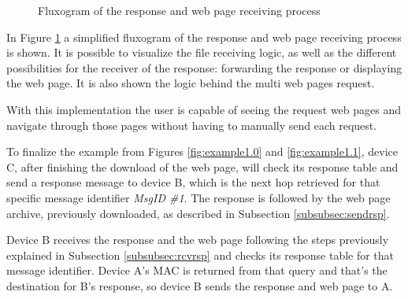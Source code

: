 \begin{figure}[ht]
   \noindent{}
	\caption{\label{fig:rsprcvflux} Fluxogram of the response and web page receiving process}
\end{figure}

In Figure \ref{fig:rsprcvflux} a simplified fluxogram of the response and web page receiving process is shown. It is possible to visualize the file receiving logic, as well as the different possibilities for the receiver of the response: forwarding the response or displaying the web page. It is also shown the logic behind the multi web pages request.

With this implementation the user is capable of seeing the request web pages and navigate through those pages without having to manually send each request.

To finalize the example from Figures \ref{fig:example1.0} and \ref{fig:example1.1}, device C, after finishing the download of the web page, will check its response table and send a response message to device B, which is the next hop retrieved for that specific message identifier \textit{MsgID \#1}. The response is followed by the web page archive, previously downloaded, as described in Subsection \ref{subsubsec:sendrsp}.

Device B receives the response and the web page following the steps previously explained in Subsection \ref{subsubsec:rcvrsp} and checks its response table for that message identifier. Device A's \gls{MAC} is returned from that query and that's the destination for B's response, so device B sends the response and web page to A.


